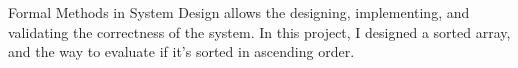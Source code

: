 Formal Methods in System Design allows the designing, implementing, and validating the correctness of the system. In this project, I designed a sorted array, and the way to evaluate if it's sorted in ascending order. 
